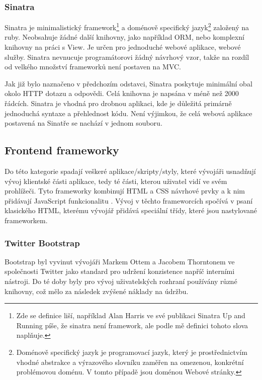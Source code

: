 \subsubsection{Sinatra}
Sinatra je minimalistický framework\footnote{Zde se definice liší, například Alan Harris ve své publikaci Sinatra Up and Running píše, že sinatra není framework, ale podle mě definici tohoto slova naplňuje.} a doménově specifický jazyk\footnote{Doménově specifický jazyk je programovací jazyk, který je prostřednictvím vhodné abstrakce a výrazového slovníku zaměřen na omezenou, konkrétní problémovou doménu. V tomto případě jsou doménou Webové stránky.} založený na ruby. Neobsahuje žádné další knihovny, jako například ORM, nebo komplexní knihovny na práci s View. Je určen pro jednoduché webové aplikace, webové služby. Sinatra nevnucuje programátorovi žádný návrhový vzor, takže na rozdíl od velkého množství frameworků není postaven na MVC.\cite{harris2011sinatra}

Jak již bylo naznačeno v předchozím odstavci, Sinatra poskytuje minimální obal okolo HTTP dotazu a odpovědi. Celá knihovna je napsána v méně než 2000 řádcích\cite{harris2011sinatra}. Sinatra je vhodná pro drobnou aplikaci, kde je důležitá primárně jednoduchá syntaxe a přehlednost kódu. Není výjimkou, že celá webová aplikace postavená na Sinatře se nachází v jednom souboru\cite{harris2011sinatra}.

\subsection{Frontend frameworky}
Do této kategorie spadají veškeré aplikace/skripty/styly, které vývojáři usnadňují vývoj klientské části aplikace, tedy té části, kterou uživatel vidí ve svém prohlížeči. Tyto frameworky kombinují HTML a CSS návrhové prvky a k nim přidávají JavaScript funkcionalitu \cite{website:wiki:bootstrap}\cite{website:boilerplate}. Vývoj v těchto frameworcích spočívá v psaní klasického HTML, kterému vývojář přidává speciální třídy, které jsou nastylované frameworkem\cite{website:wiki:bootstrap}.

\subsubsection{Twitter Bootstrap}
Bootstrap byl vyvinut vývojáři Markem Ottem a Jacobem Thorntonem ve společnosti Twitter jako standard pro udržení konzistence napříč interními nástroji. Do té doby byly pro vývoj uživatelských rozhraní používány různé knihovny, což mělo za následek zvýšené náklady na údržbu.

